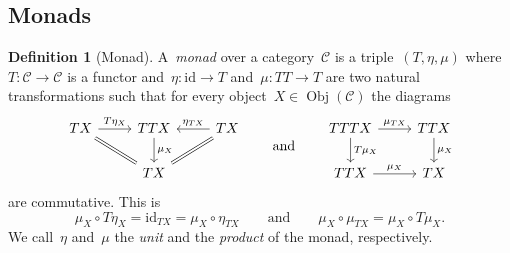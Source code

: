 \documentclass[a4paper]{article}
\theoremstyle{plain}
\theoremstyle{definition}
\newtheorem{definition}[theorem]{Definition}
\DeclareMathOperator{\Obj}{Obj}
\newcommand{\id}{\mathrm{id}}
\newcommand{\cat}[1]{\mathcal{#1}}
\begin{document}
\subsection{Monads}
\begin{definition}[Monad]
    \label{def:monad}
    A~\emph{monad} over a category~\(\cat{C}\) is a triple~\((T,\eta,\mu)\)
    where~\(T:\cat{C}\longrightarrow\cat{C}\) is a functor
    and~\(\eta:\id\longrightarrow T\) and~\(\mu:TT\longrightarrow T\) are two
    natural transformations such that for every object~\(X\in\Obj(\cat{C})\) the
    diagrams
    \[
        \begin{tikzcd}
            TX \arrow[r, "T\eta_{X}"] & TTX \arrow[d, "\mu_{X}"] & TX \arrow[l,
            swap, "\eta_{TX}"] \\
                                      & TX \arrow[ul, equal] \arrow[ur, equal] &
        \end{tikzcd}
        \qquad\text{and}\qquad
        \begin{tikzcd}
            TTTX \arrow[r, "\mu_{TX}"] \arrow[d, "T\mu_{X}"] & TTX \arrow[d,
            "\mu_{X}"] \\
            TTX \arrow[r, "\mu_{X}"] & TX
        \end{tikzcd}
    \]
    are commutative. This is
    \[
        \mu_{X}\circ T\eta_{X} = \id_{TX} = \mu_{X}\circ\eta_{TX}
        \qquad\text{and}\qquad
        \mu_{X}\circ \mu_{TX}
        = \mu_{X} \circ T\mu_{X}.
    \]
    We call~\(\eta\) and~\(\mu\) the \emph{unit} and the \emph{product} of the
    monad, respectively.
\end{definition}
\end{document}
